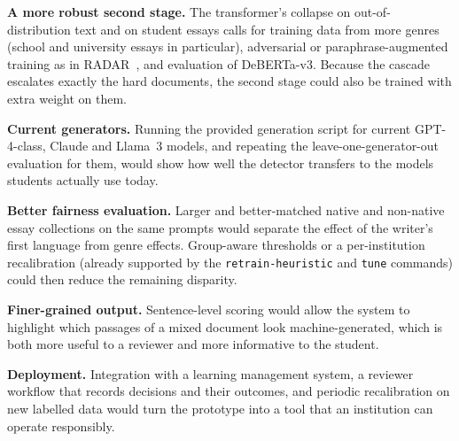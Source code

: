 \textbf{A more robust second stage.} The transformer's collapse on
out-of-distribution text and on student essays calls for training data from
more genres (school and university essays in particular), adversarial or
paraphrase-augmented training as in RADAR~\cite{hu2023radar}, and evaluation
of DeBERTa-v3. Because the cascade escalates exactly the hard documents, the
second stage could also be trained with extra weight on them.

\textbf{Current generators.} Running the provided generation script for
current GPT-4-class, Claude and Llama~3 models, and repeating the
leave-one-generator-out evaluation for them, would show how well the detector
transfers to the models students actually use today.

\textbf{Better fairness evaluation.} Larger and better-matched native and
non-native essay collections on the same prompts would separate the effect of
the writer's first language from genre effects. Group-aware thresholds or a
per-institution recalibration (already supported by the
\texttt{retrain-heuristic} and \texttt{tune} commands) could then reduce the
remaining disparity.

\textbf{Finer-grained output.} Sentence-level scoring would allow the system to
highlight which passages of a mixed document look machine-generated, which is
both more useful to a reviewer and more informative to the student.

\textbf{Deployment.} Integration with a learning management system, a
reviewer workflow that records decisions and their outcomes, and periodic
recalibration on new labelled data would turn the prototype into a tool that an
institution can operate responsibly.
